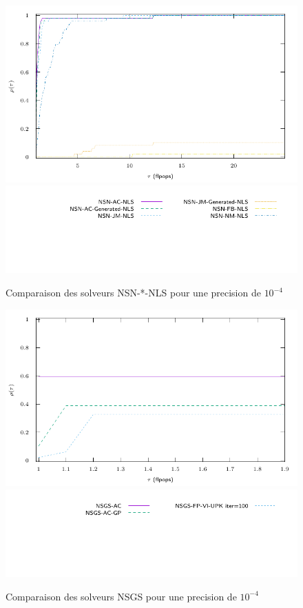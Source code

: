 \documentclass{CSMA2017}
\begin{document}
\begin{figure}
  \centering
  \includegraphics{figure/LowWall_FEM.1e-4/nsn_nls/profile-LMGC_LowWall_FEM.pdf}
  \includegraphics{figure/LowWall_FEM.1e-4/nsn_nls/profile-LMGC_LowWall_FEM_legend.pdf}
  \caption{Comparaison des solveurs NSN-*-NLS pour une precision de $10^{-4}$}
  \label{fig:LowWall_FEM.1e-4.nsn_nls}
\end{figure}
\begin{figure}
  \centering
  \includegraphics{figure/LowWall_FEM.1e-4/nsgs/profile-LMGC_LowWall_FEM.pdf}
  \includegraphics{figure/LowWall_FEM.1e-4/nsgs/profile-LMGC_LowWall_FEM_legend.pdf}
  \caption{Comparaison des solveurs NSGS pour une precision de $10^{-4}$}
  \label{fig:LowWall_FEM.1e-4.nsgs}
\end{figure}
\end{document}
